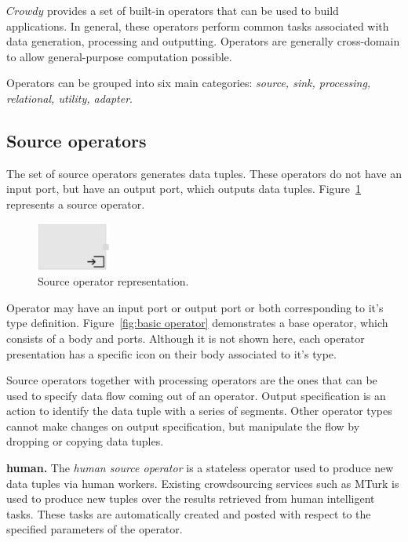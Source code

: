 $Crowdy$ provides a set of built-in operators that can be used to build applications. 
In general, these operators perform common tasks associated with data generation, 
processing and outputting. Operators are generally cross-domain to allow general-purpose 
computation possible.

Operators can be grouped into six main categories: 
\textit{source, sink, processing, relational, utility, adapter}.

\subsection{Source operators}
The set of source operators generates data tuples. These operators do not have 
an input port, but have an output port, which outputs data tuples. Figure~\ref{fig:source operator} 
represents a source operator.

\begin{figure}[ht]
	\centering
	\includegraphics[height=60px]{figures/SourceOperator.pdf}
	\caption{Source operator representation.}
	\label{fig:source operator}
\end{figure}

Operator may have an input port or output port or both corresponding to it's type 
definition. Figure~\ref{fig:basic operator} demonstrates a base operator, which 
consists of a body and ports. Although it is not shown here, each operator presentation 
has a specific icon on their body associated to it's type.

Source operators together with processing operators are the ones that can be 
used to specify data flow coming out of an operator. Output specification is an 
action to identify the data tuple with a series of segments. Other operator types 
cannot make changes on output specification, but manipulate the flow by dropping 
or copying data tuples.

\textbf{human.} 
The \textit{human source operator} is a stateless operator used to produce new data tuples 
via human workers. Existing crowdsourcing services such as MTurk is used 
to produce new tuples over the results retrieved from human intelligent tasks. These 
tasks are automatically created and posted with respect to the specified parameters 
of the operator.

